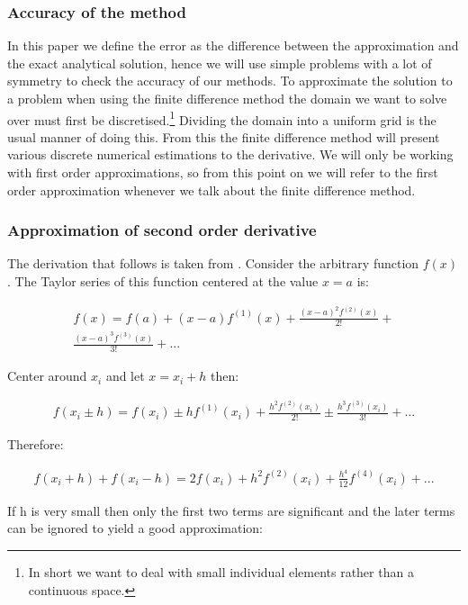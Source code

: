 \documentclass[aps,twocolumn,pre,nofootinbib,10pt]{revtex4-1}
\begin{document}
\subsubsection{Accuracy of the method}

\par\hspace{4mm} In this paper we define the error as the difference between the approximation and the exact analytical solution, hence we will use simple problems with a lot of symmetry to check the accuracy of our methods. To approximate the solution to a problem when using the finite difference method the domain we want to solve over must first be discretised.\footnote{In short we want to deal with small individual elements rather than a continuous space.} Dividing the domain into a uniform grid is the usual manner of doing this. From this the finite difference method will present various discrete numerical estimations to the derivative. We will only be working with first order approximations, so from this point on we will refer to the first order approximation whenever we talk about the finite difference method.

\subsubsection{Approximation of second order derivative}
The derivation that follows is taken from \cite{compmethods}. Consider the arbitrary function \(f(x)\). The Taylor series of this function centered at the value \(x=a\) is:

\begin{gather*}
f(x) = f(a) +(x-a)f^{(1)}(x)+\frac{(x-a)^{2}f^{(2)}(x)}{2!}+ \\
\frac{(x-a)^{3}f^{(3)}(x)}{3!}+...
\end{gather*}

Center around $x_i$ and let \(x=x_i + h\) then:

\begin{gather*}
f(x_i\pm h)=f(x_i) \pm hf^{(1)}(x_i)+\frac{h^2f^{(2)}(x_i)}{2!} \pm \frac{h^3f^{(3)}(x_i)}{3!}+...
\end{gather*}

Therefore:

\begin{gather*}
f(x_i+h)+f(x_i-h) = 2f(x_i) + h^2f^{(2)}(x_i) +\frac{h^4}{12}f^{(4)}(x_i)+...
\end{gather*}

If h is very small then only the first two terms are significant and the later terms can be ignored to yield a good approximation:
\end{document}
